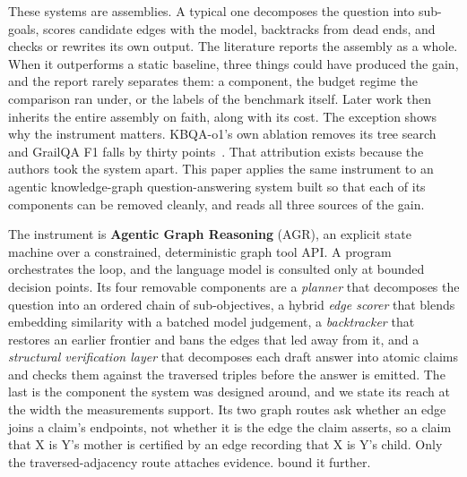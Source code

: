 These systems are assemblies. A typical one decomposes the question into
sub-goals, scores candidate edges with the model, backtracks from dead
ends, and checks or rewrites its own output. The literature reports the
assembly as a whole. When it outperforms a static baseline, three things
could have produced the gain, and the report rarely separates them: a
component, the budget regime the comparison ran under, or the labels of
the benchmark itself. Later work then inherits the entire assembly on
faith, along with its cost. The exception shows why the instrument
matters. KBQA-o1's own ablation removes its tree search and GrailQA F1
falls by thirty points~\cite{luo2025kbqao1}. That attribution exists
because the authors took the system apart. This paper applies the same
instrument to an agentic knowledge-graph question-answering system built
so that each of its components can be removed cleanly, and reads all
three sources of the gain.

The instrument is \textbf{Agentic Graph Reasoning} (AGR), an explicit
state machine over a constrained, deterministic graph tool API. A
program orchestrates the loop, and the language model is consulted only
at bounded decision points. Its four removable components are a
\emph{planner} that decomposes the question into an ordered chain of
sub-objectives, a hybrid \emph{edge scorer} that blends embedding
similarity with a batched model judgement, a \emph{backtracker} that
restores an earlier frontier and bans the edges that led away from it,
and a \emph{structural verification layer} that decomposes each draft
answer into atomic claims and checks them against the traversed triples
before the answer is emitted. The last is the component the system was
designed around, and we state its reach at the width the measurements
support. Its two graph routes ask whether an edge joins a claim's
endpoints, not whether it is the edge the claim asserts, so a claim that
X is Y's mother is certified by an edge recording that X is Y's child.
Only the traversed-adjacency route attaches evidence.
 bound it further.

